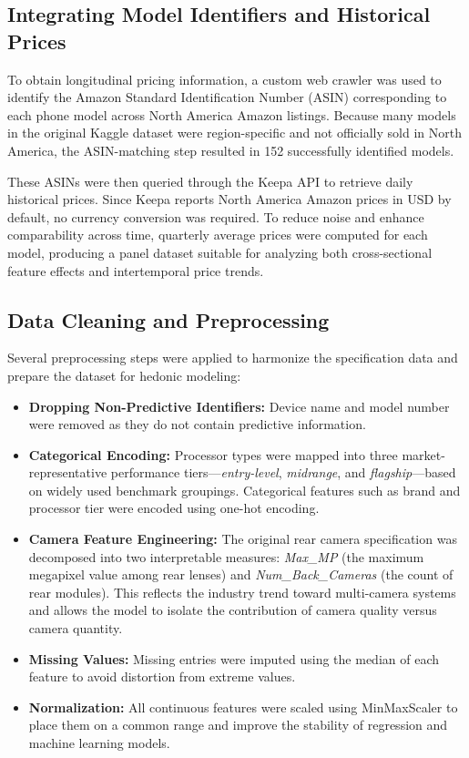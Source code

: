 \documentclass[12pt]{article}
\begin{document}
\subsection{Integrating Model Identifiers and Historical Prices}

To obtain longitudinal pricing information, a custom web crawler was used to identify the Amazon Standard Identification Number (ASIN) corresponding to each phone model across North America Amazon listings. Because many models in the original Kaggle dataset were region-specific and not officially sold in North America, the ASIN-matching step resulted in 152 successfully identified models.

These ASINs were then queried through the Keepa API to retrieve daily historical prices. Since Keepa reports North America Amazon prices in USD by default, no currency conversion was required. To reduce noise and enhance comparability across time, quarterly average prices were computed for each model, producing a panel dataset suitable for analyzing both cross-sectional feature effects and intertemporal price trends.

\subsection{Data Cleaning and Preprocessing}

Several preprocessing steps were applied to harmonize the specification data and prepare the dataset for hedonic modeling:

\begin{itemize}
    \item \textbf{Dropping Non-Predictive Identifiers:} Device name and model number were removed as they do not contain predictive information.
    \item \textbf{Categorical Encoding:} Processor types were mapped into three market-representative performance tiers—\textit{entry-level}, \textit{midrange}, and \textit{flagship}—based on widely used benchmark groupings. Categorical features such as brand and processor tier were encoded using one-hot encoding.
    \item \textbf{Camera Feature Engineering:} The original rear camera specification was decomposed into two interpretable measures: \textit{Max\_MP} (the maximum megapixel value among rear lenses) and \textit{Num\_Back\_Cameras} (the count of rear modules). This reflects the industry trend toward multi-camera systems and allows the model to isolate the contribution of camera quality versus camera quantity.
    \item \textbf{Missing Values:} Missing entries were imputed using the median of each feature to avoid distortion from extreme values.
    \item \textbf{Normalization:} All continuous features were scaled using MinMaxScaler to place them on a common range and improve the stability of regression and machine learning models.
\end{itemize}
\end{document}
